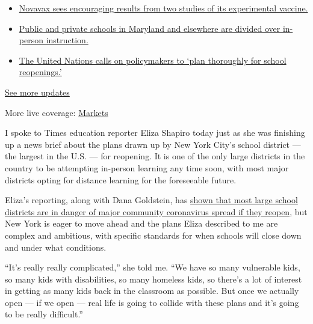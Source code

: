 \begin{itemize}
\tightlist
\item
  \href{https://www.nytimes.com/2020/08/04/world/coronavirus-cases.html?action=click\&pgtype=Article\&state=default\&region=MAIN_CONTENT_1\&context=storylines_live_updates\#link-1228a480}{Novavax
  sees encouraging results from two studies of its experimental
  vaccine.}
\item
  \href{https://www.nytimes.com/2020/08/04/world/coronavirus-cases.html?action=click\&pgtype=Article\&state=default\&region=MAIN_CONTENT_1\&context=storylines_live_updates\#link-4825b93}{Public
  and private schools in Maryland and elsewhere are divided over
  in-person instruction.}
\item
  \href{https://www.nytimes.com/2020/08/04/world/coronavirus-cases.html?action=click\&pgtype=Article\&state=default\&region=MAIN_CONTENT_1\&context=storylines_live_updates\#link-50f7386d}{The
  United Nations calls on policymakers to `plan thoroughly for school
  reopenings.'}
\end{itemize}

\href{https://www.nytimes.com/2020/08/04/world/coronavirus-cases.html?action=click\&pgtype=Article\&state=default\&region=MAIN_CONTENT_1\&context=storylines_live_updates}{See
more updates}

More live coverage:
\href{https://www.nytimes.com/live/2020/08/04/business/stock-market-today-coronavirus?action=click\&pgtype=Article\&state=default\&region=MAIN_CONTENT_1\&context=storylines_live_updates}{Markets}

I spoke to Times education reporter Eliza Shapiro today just as she was
finishing up a news brief about the plans drawn up by New York City's
school district --- the largest in the U.S. --- for reopening. It is one
of the only large districts in the country to be attempting in-person
learning any time soon, with most major districts opting for distance
learning for the foreseeable future.

Eliza's reporting, along with Dana Goldstein, has
\href{https://www.nytimes.com/2020/07/14/us/coronavirus-schools-fall.html}{shown
that most large school districts are in danger of major community
coronavirus spread if they reopen}, but New York is eager to move ahead
and the plans Eliza described to me are complex and ambitious, with
specific standards for when schools will close down and under what
conditions.

``It's really really complicated,'' she told me. ``We have so many
vulnerable kids, so many kids with disabilities, so many homeless kids,
so there's a lot of interest in getting as many kids back in the
classroom as possible. But once we actually open --- if we open --- real
life is going to collide with these plans and it's going to be really
difficult.''

